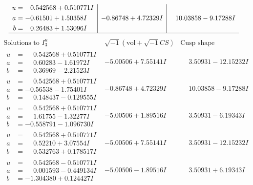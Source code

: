 \documentclass[1p]{elsarticle_modified}
\theoremstyle{definition}
\newcommand{\I}{\sqrt{-1}}
\begin{document}
$$\begin{array}{c|c|c}
\begin{aligned}
u &= \phantom{-}0.542568 + 0.510771 I \\
a &= -0.61501 + 1.50358 I \\
b &= \phantom{-}0.26483 + 1.53096 I\end{aligned}
 & -0.86748 + 4.72329 I & \phantom{-}10.03858 - 9.17288 I\\
 \hline 
 \end{array}$$\newpage$$\begin{array}{c|c|c}  
\text{Solutions to }I^u_{3}& \I (\text{vol} + \sqrt{-1}CS) & \text{Cusp shape}\\
 \hline 
\begin{aligned}
u &= \phantom{-}0.542568 + 0.510771 I \\
a &= \phantom{-}0.60283 - 1.61972 I \\
b &= \phantom{-}0.36969 - 2.21523 I\end{aligned}
 & -5.00506 + 7.55141 I & \phantom{-}3.50931 - 12.15232 I \\ \hline\begin{aligned}
u &= \phantom{-}0.542568 + 0.510771 I \\
a &= -0.56538 - 1.75401 I \\
b &= \phantom{-}0.148437 - 0.129555 I\end{aligned}
 & -0.86748 + 4.72329 I & \phantom{-}10.03858 - 9.17288 I \\ \hline\begin{aligned}
u &= \phantom{-}0.542568 + 0.510771 I \\
a &= \phantom{-}1.61755 - 1.32277 I \\
b &= -0.558791 - 1.096730 I\end{aligned}
 & -5.00506 + 1.89516 I & \phantom{-}3.50931 - 6.19343 I \\ \hline\begin{aligned}
u &= \phantom{-}0.542568 + 0.510771 I \\
a &= \phantom{-}0.52210 + 3.07554 I \\
b &= \phantom{-}0.532763 + 0.178517 I\end{aligned}
 & -5.00506 + 7.55141 I & \phantom{-}3.50931 - 12.15232 I \\ \hline\begin{aligned}
u &= \phantom{-}0.542568 - 0.510771 I \\
a &= \phantom{-}0.001593 - 0.449134 I \\
b &= -1.304380 + 0.124427 I\end{aligned}
 & -5.00506 - 1.89516 I & \phantom{-}3.50931 + 6.19343 I \\ \hline\begin{aligned}

\end{aligned}
\end{array}$$
\end{document}
